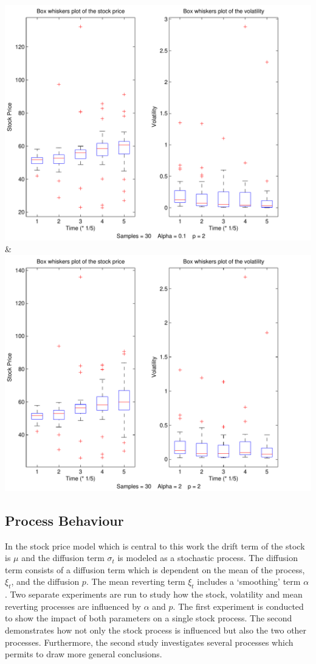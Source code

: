 \documentclass[a4paper,onecolumn]{IEEEtran}
\begin{document}
{		 \includegraphics[width=\stockplotsize]{box_s30_a0-1_p2}&
			\includegraphics[width=\stockplotsize]{box_s30_a2_p2}\LL
			}


\subsection{Process Behaviour}
In the stock price model which is central to this work the drift term of the
stock is $\mu$ and the diffusion term $\sigma_t$ is modeled as a stochastic
process. The diffusion term consists of a diffusion term which is dependent on
the mean of the process, $\xi_t$, and the diffusion $p$. The mean reverting
term $\xi_t$ includes a `smoothing' term $\alpha$. Two separate experiments
are run to study how the stock, volatility and mean reverting processes are
influenced by $\alpha$ and $p$. The first experiment is conducted to show the
impact of both parameters on a single stock process. The second demonstrates
how not only the stock process is influenced but also the two other processes.
Furthermore, the second study investigates several processes which permits to
draw more general conclusions.
\end{document}

